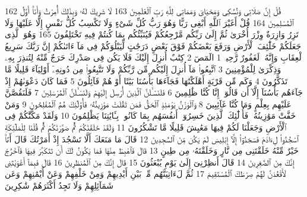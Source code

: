 {\tiny\colorbox{cl_aya}{162}} قُلْ إِنَّ صَلَاتِى وَنُسُكِى وَمَحْيَاىَ وَمَمَاتِى لِلَّهِ رَبِّ ٱلْعَٰلَمِينَ
{\tiny\colorbox{cl_aya}{163}} لَا شَرِيكَ لَهُۥ وَبِذَٰلِكَ أُمِرْتُ وَأَنَا۠ أَوَّلُ ٱلْمُسْلِمِينَ
{\tiny\colorbox{cl_aya}{164}} قُلْ أَغَيْرَ ٱللَّهِ أَبْغِى رَبًّا وَهُوَ رَبُّ كُلِّ شَىْءٍ وَلَا تَكْسِبُ كُلُّ نَفْسٍ إِلَّا عَلَيْهَا وَلَا تَزِرُ وَازِرَةٌ وِزْرَ أُخْرَىٰ ثُمَّ إِلَىٰ رَبِّكُم مَّرْجِعُكُمْ فَيُنَبِّئُكُم بِمَا كُنتُمْ فِيهِ تَخْتَلِفُونَ
{\tiny\colorbox{cl_aya}{165}} وَهُوَ ٱلَّذِى جَعَلَكُمْ خَلَٰٓئِفَ ٱلْأَرْضِ وَرَفَعَ بَعْضَكُمْ فَوْقَ بَعْضٍ دَرَجَٰتٍ لِّيَبْلُوَكُمْ فِى مَآ ءَاتَىٰكُمْ إِنَّ رَبَّكَ سَرِيعُ ٱلْعِقَابِ وَإِنَّهُۥ لَغَفُورٌ رَّحِيمٌۢ
{\tiny\colorbox{cl_aya}{1}} الٓمٓصٓ
{\tiny\colorbox{cl_aya}{2}} كِتَٰبٌ أُنزِلَ إِلَيْكَ فَلَا يَكُن فِى صَدْرِكَ حَرَجٌ مِّنْهُ لِتُنذِرَ بِهِۦ وَذِكْرَىٰ لِلْمُؤْمِنِينَ
{\tiny\colorbox{cl_aya}{3}} ٱتَّبِعُوا۟ مَآ أُنزِلَ إِلَيْكُم مِّن رَّبِّكُمْ وَلَا تَتَّبِعُوا۟ مِن دُونِهِۦٓ أَوْلِيَآءَ قَلِيلًا مَّا تَذَكَّرُونَ
{\tiny\colorbox{cl_aya}{4}} وَكَم مِّن قَرْيَةٍ أَهْلَكْنَٰهَا فَجَآءَهَا بَأْسُنَا بَيَٰتًا أَوْ هُمْ قَآئِلُونَ
{\tiny\colorbox{cl_aya}{5}} فَمَا كَانَ دَعْوَىٰهُمْ إِذْ جَآءَهُم بَأْسُنَآ إِلَّآ أَن قَالُوٓا۟ إِنَّا كُنَّا ظَٰلِمِينَ
{\tiny\colorbox{cl_aya}{6}} فَلَنَسْـَٔلَنَّ ٱلَّذِينَ أُرْسِلَ إِلَيْهِمْ وَلَنَسْـَٔلَنَّ ٱلْمُرْسَلِينَ
{\tiny\colorbox{cl_aya}{7}} فَلَنَقُصَّنَّ عَلَيْهِم بِعِلْمٍ وَمَا كُنَّا غَآئِبِينَ
{\tiny\colorbox{cl_aya}{8}} وَٱلْوَزْنُ يَوْمَئِذٍ ٱلْحَقُّ فَمَن ثَقُلَتْ مَوَٰزِينُهُۥ فَأُو۟لَٰٓئِكَ هُمُ ٱلْمُفْلِحُونَ
{\tiny\colorbox{cl_aya}{9}} وَمَنْ خَفَّتْ مَوَٰزِينُهُۥ فَأُو۟لَٰٓئِكَ ٱلَّذِينَ خَسِرُوٓا۟ أَنفُسَهُم بِمَا كَانُوا۟ بِـَٔايَٰتِنَا يَظْلِمُونَ
{\tiny\colorbox{cl_aya}{10}} وَلَقَدْ مَكَّنَّٰكُمْ فِى ٱلْأَرْضِ وَجَعَلْنَا لَكُمْ فِيهَا مَعَٰيِشَ قَلِيلًا مَّا تَشْكُرُونَ
{\tiny\colorbox{cl_aya}{11}} وَلَقَدْ خَلَقْنَٰكُمْ ثُمَّ صَوَّرْنَٰكُمْ ثُمَّ قُلْنَا لِلْمَلَٰٓئِكَةِ ٱسْجُدُوا۟ لِءَادَمَ فَسَجَدُوٓا۟ إِلَّآ إِبْلِيسَ لَمْ يَكُن مِّنَ ٱلسَّٰجِدِينَ
{\tiny\colorbox{cl_aya}{12}} قَالَ مَا مَنَعَكَ أَلَّا تَسْجُدَ إِذْ أَمَرْتُكَ قَالَ أَنَا۠ خَيْرٌ مِّنْهُ خَلَقْتَنِى مِن نَّارٍ وَخَلَقْتَهُۥ مِن طِينٍ
{\tiny\colorbox{cl_aya}{13}} قَالَ فَٱهْبِطْ مِنْهَا فَمَا يَكُونُ لَكَ أَن تَتَكَبَّرَ فِيهَا فَٱخْرُجْ إِنَّكَ مِنَ ٱلصَّٰغِرِينَ
{\tiny\colorbox{cl_aya}{14}} قَالَ أَنظِرْنِىٓ إِلَىٰ يَوْمِ يُبْعَثُونَ
{\tiny\colorbox{cl_aya}{15}} قَالَ إِنَّكَ مِنَ ٱلْمُنظَرِينَ
{\tiny\colorbox{cl_aya}{16}} قَالَ فَبِمَآ أَغْوَيْتَنِى لَأَقْعُدَنَّ لَهُمْ صِرَٰطَكَ ٱلْمُسْتَقِيمَ
{\tiny\colorbox{cl_aya}{17}} ثُمَّ لَءَاتِيَنَّهُم مِّنۢ بَيْنِ أَيْدِيهِمْ وَمِنْ خَلْفِهِمْ وَعَنْ أَيْمَٰنِهِمْ وَعَن شَمَآئِلِهِمْ وَلَا تَجِدُ أَكْثَرَهُمْ شَٰكِرِينَ
